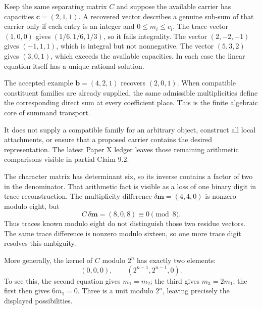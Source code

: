 Keep the same separating matrix $C$ and suppose the available carrier has capacities $\bm c=(2,1,1)$. A recovered vector describes a genuine sub-sum of that carrier only if each entry is an integer and $0\le m_i\le c_i$.
The trace vector $(1,0,0)$ gives $(1/6,1/6,1/3)$, so it fails integrality. The vector $(2,-2,-1)$ gives $(-1,1,1)$, which is integral but not nonnegative. The vector $(5,3,2)$ gives $(3,0,1)$, which exceeds the available capacities. In each case the linear equation itself has a unique rational solution.

The accepted example $\bm b=(4,2,1)$ recovers $(2,0,1)$. When compatible constituent families are already supplied, the same admissible multiplicities define the corresponding direct sum at every coefficient place. This is the finite algebraic core of summand transport.

It does not supply a compatible family for an arbitrary object, construct all local attachments, or ensure that a proposed carrier contains the desired representation. The latest Paper X ledger leaves those remaining arithmetic comparisons visible in partial Claim 9.2.

The character matrix has determinant six, so its inverse contains a factor of two in the denominator. That arithmetic fact is visible as a loss of one binary digit in trace reconstruction.
The multiplicity difference $\delta\bm m=(4,4,0)$ is nonzero modulo eight, but
\[
C\,\delta\bm m=(8,0,8)\equiv0\pmod8.
\]
Thus traces known modulo eight do not distinguish those two residue vectors. The same trace difference is nonzero modulo sixteen, so one more trace digit resolves this ambiguity.

More generally, the kernel of $C$ modulo $2^n$ has exactly two elements:
\[
(0,0,0),\qquad(2^{n-1},2^{n-1},0).
\]
To see this, the second equation gives $m_1=m_2$; the third gives $m_3=2m_1$; the first then gives $6m_1=0$. Three is a unit modulo $2^n$, leaving precisely the displayed possibilities.

